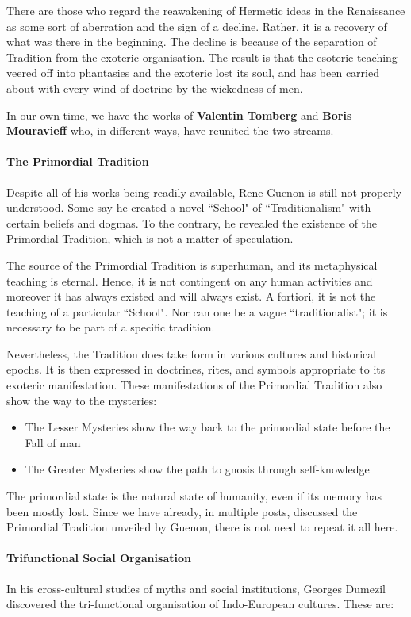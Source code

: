 There are those who regard the reawakening of Hermetic ideas in the Renaissance as some sort of aberration and the sign of a decline. Rather, it is a recovery of what was there in the beginning. The decline is because of the separation of Tradition from the exoteric organisation. The result is that the esoteric teaching veered off into phantasies and the exoteric lost its soul, and has been carried about with every wind of doctrine by the wickedness of men.

In our own time, we have the works of \textbf{Valentin Tomberg} and \textbf{Boris Mouravieff} who, in different ways, have reunited the two streams.

\paragraph{The Primordial Tradition}
Despite all of his works being readily available, Rene Guenon is still not properly understood. Some say he created a novel ``School" of ``Traditionalism" with certain beliefs and dogmas. To the contrary, he revealed the existence of the Primordial Tradition, which is not a matter of speculation.

The source of the Primordial Tradition is superhuman, and its metaphysical teaching is eternal. Hence, it is not contingent on any human activities and moreover it has always existed and will always exist. A fortiori, it is not the teaching of a particular ``School". Nor can one be a vague ``traditionalist"; it is necessary to be part of a specific tradition.

Nevertheless, the Tradition does take form in various cultures and historical epochs. It is then expressed in doctrines, rites, and symbols appropriate to its exoteric manifestation. These manifestations of the Primordial Tradition also show the way to the mysteries:

\begin{itemize}
\item The Lesser Mysteries show the way back to the primordial state before the Fall of man 
\item The Greater Mysteries show the path to gnosis through self-knowledge 
\end{itemize}
The primordial state is the natural state of humanity, even if its memory has been mostly lost. Since we have already, in multiple posts, discussed the Primordial Tradition unveiled by Guenon, there is not need to repeat it all here.

\paragraph{Trifunctional Social Organisation}
In his cross-cultural studies of myths and social institutions, Georges Dumezil discovered the tri-functional organisation of Indo-European cultures. These are:

